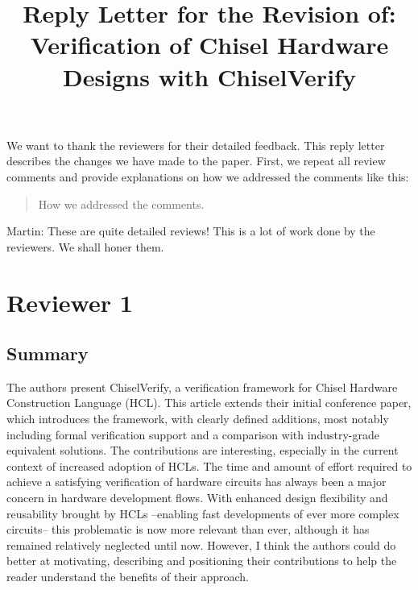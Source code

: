 \documentclass{article}
\newcommand{\martin}[1]{{\color{blue} Martin: #1\\}}
\newcommand{\reply}[1]{{\color{blue} #1}}
\begin{document}

\title{Reply Letter for the Revision of:\\[2ex]Verification of Chisel Hardware Designs with ChiselVerify}


\maketitle \thispagestyle{empty}


We want to thank the reviewers for their detailed feedback.
This reply letter describes the changes we have made to the paper.
First, we repeat all review comments and provide explanations on how we addressed the comments like this:

\begin{quote}
\reply{How we addressed the comments.}
\end{quote}



\martin{These are quite detailed reviews! This is a lot of work done by the reviewers. We shall honer them.}


\section*{Reviewer 1}



\subsection*{Summary}
The authors present ChiselVerify, a verification framework for Chisel Hardware Construction Language (HCL).
This article extends their initial conference paper, which introduces the framework, with clearly defined additions, most notably including formal verification support and a comparison with industry-grade equivalent solutions.
The contributions are interesting, especially in the current context of increased adoption of HCLs.
The time and amount of effort required to achieve a satisfying verification of hardware circuits has always been a major concern in hardware development flows.
With enhanced design flexibility and reusability brought by HCLs --enabling fast developments of ever more complex circuits-- this problematic is now more relevant than ever, although it has remained relatively neglected until now.
However, I think the authors could do better at motivating, describing and positioning their contributions to help the reader understand the benefits of their approach.
\end{document}
